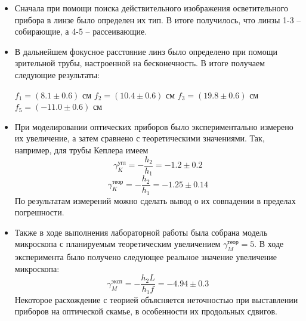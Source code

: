 \documentclass[a4paper,12pt]{article}
\begin{document}
\begin{itemize}
	\item Сначала при помощи поиска действительного изображения осветительного прибора в линзе было определен их тип. В итоге получилось, что линзы 1-3 -- собирающие, а 4-5 -- рассеивающие.
	\item В дальнейшем фокусное расстояние линз было определено при помощи зрительной трубы, настроенной на бесконечность. В итоге получаем следующие результаты:
	\begin{center}
		$f_1 = (8.1 \pm 0.6)$ см \hspace{1cm}  $f_2 = (10.4\pm0.6)$ см \hspace{1cm}  $f_3 = (19.8 \pm 0.6)$ см\hspace{1cm}  $f_5 = (-11.0 \pm 0.6)$ см
	\end{center}
	\item При моделировании оптических приборов было экспериментально измерено их увеличение, а затем сравнено с теоретическими значениями. Так, например, для трубы Кеплера имеем
	\[\gamma_K^\text{угл} = -\frac{h_2}{h_1} = -1.2 \pm 0.2 \]
	\[\gamma_K^\text{теор} = -\frac{h_2}{h_1} = -1.25 \pm 0.14 \]
	По результатам измерений можно сделать вывод о их совпадении в пределах погрешности.
	\item Также в ходе выполнения лабораторной работы была собрана модель микроскопа с планируемым теоретическим увеличением $  \gamma_M^\text{теор} = 5 $. В ходе эксперимента было получено следующее реальное значение увеличение микроскопа:
	\[ \gamma_M^\text{эксп} = -\frac{h_2L}{h_1f} = -4.94 \pm 0.3 \]
	Некоторое расхождение с теорией объясняется неточностью при выставлении приборов на оптической скамье, в особенности их продольных сдвигов.
\end{itemize}
\end{document}
